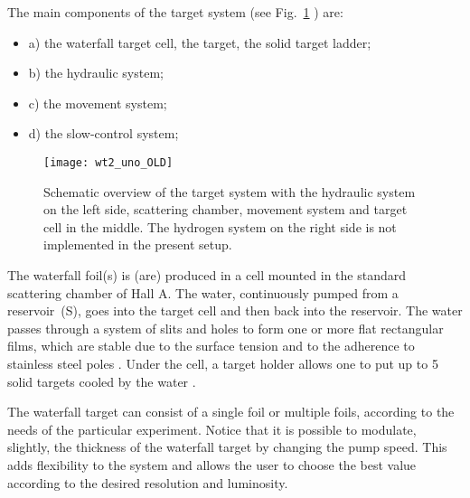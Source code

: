 The main components of the target system (see Fig.~\ref{fig:wt_uno}
) are: 
\begin{itemize}
\item a) the waterfall target cell, the target, the solid target ladder; 
\item b) the hydraulic system; 
\item c) the movement system; 
\item d) the slow-control system; 
\end{itemize}

\begin{figure}[htp]
\begin{center}\texttt{[image: wt2\_uno\_OLD]}\end{center}
\caption{Schematic overview of the target system with the hydraulic system
  on the left side, scattering chamber, movement system and target cell
  in the middle. The hydrogen system on the right side is not implemented
  in the present setup.}
\label{fig:wt_uno}
\end{figure}

%

The waterfall foil(s) is (are) produced in a cell mounted in the standard
scattering chamber 
of Hall A. 
The water, continuously pumped from a reservoir~(S), goes into
the target cell and then back into the reservoir. The water passes
through a system of slits and holes to form one or more flat rectangular
films, which are stable due to the surface tension and to the adherence
to stainless steel poles%
.
Under the cell, a
target holder allows one to put up to 5 solid targets cooled by the
water%
.

The waterfall target can consist of a single foil or multiple foils,
according to the needs of the particular experiment. Notice that it
is possible to modulate, slightly, the thickness of the waterfall
target by changing the pump speed. This adds flexibility to the system
and allows the user to choose the best value according to the desired
resolution and luminosity.


